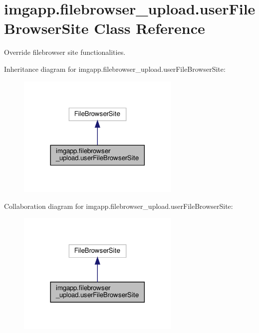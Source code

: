 \hypertarget{classimgapp_1_1filebrowser__upload_1_1userFileBrowserSite}{}\section{imgapp.\+filebrowser\+\_\+upload.\+user\+File\+Browser\+Site Class Reference}
\label{classimgapp_1_1filebrowser__upload_1_1userFileBrowserSite}


Override filebrowser site functionalities.  




Inheritance diagram for imgapp.\+filebrowser\+\_\+upload.\+user\+File\+Browser\+Site\+:
\nopagebreak
\begin{figure}[H]
\begin{center}
\leavevmode
\includegraphics[width=221pt]{classimgapp_1_1filebrowser__upload_1_1userFileBrowserSite__inherit__graph}
\end{center}
\end{figure}


Collaboration diagram for imgapp.\+filebrowser\+\_\+upload.\+user\+File\+Browser\+Site\+:
\nopagebreak
\begin{figure}[H]
\begin{center}
\leavevmode
\includegraphics[width=221pt]{classimgapp_1_1filebrowser__upload_1_1userFileBrowserSite__coll__graph}
\end{center}
\end{figure}
